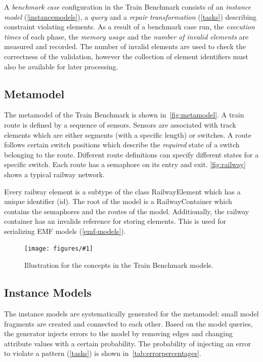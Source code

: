 \documentclass[submission,copyright,creativecommons]{eptcs}
\newcommand{\tb}{Train Benchmark\xspace}
\newcommand{\figref}[1]{\autoref{fig:#1}}
\newcommand{\ttcfig}[2]{
\begin{figure}[htb] 
	\centering
	\texttt{[image: figures/\#1]}
	\caption{#2.}
	\vspace{-1em}
	\label{fig:#1}
\end{figure}}
\begin{document}
A \emph{benchmark case} configuration in the \tb consists of an \emph{instance model} (\autoref{instancemodels}), a \emph{query} and a \emph{repair transformation} (\autoref{tasks}) describing constraint violating elements. As a result of a benchmark case run, the \emph{execution times} of each phase, the \emph{memory usage} and the \emph{number of invalid elements} are measured and recorded. The number of invalid elements are used to check the correctness of the validation, however the collection of element identifiers must also be available for later processing.

\subsection{Metamodel}

The metamodel of the \tb is shown in~\figref{metamodel}. A train \textsf{route} is defined by a sequence of \textsf{sensor}s. Sensors are associated with \textsf{track elements} which are either \textsf{segment}s (with a specific length) or \textsf{switch}es. A route follows certain \textsf{switch positions} which describe the \emph{required} state of a switch belonging to the route. Different route definitions can specify different states for a specific switch. Each route has a \textsf{semaphore} on its entry and exit. \figref{railway} shows a typical railway network.

Every railway element is a subtype of the class \textsf{RailwayElement} which has a unique identifier (\textsf{id}). The root of the model is a \textsf{RailwayContainer} which contains the semaphores and the routes of the model. Additionally, the railway container has an \textsf{invalids} reference for storing elements. This is used for serializing EMF models (\autoref{emf-models}). 

\ttcfig{railway}{Illustration for the concepts in the \tb models}

\subsection{Instance Models}
\label{instancemodels}

The instance models are systematically generated for the metamodel: small model fragments are created and connected to each other. Based on the model queries, the generator injects errors to the model by removing edges and changing attribute values with a certain probability. The probability of injecting an error to violate a pattern (\autoref{tasks}) is shown in~\autoref{tab:errorpercentages}.
\end{document}
